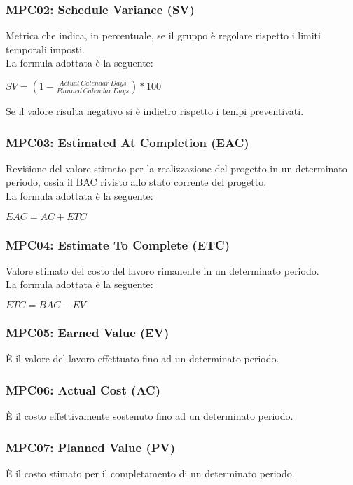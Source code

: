     \subsubsection{MPC02: Schedule Variance (SV)}
    Metrica che indica, in percentuale, se il gruppo è regolare rispetto i limiti temporali imposti.\\
    La formula adottata è la seguente:
    \begin{center}
        $SV = (1-\frac{Actual\ Calendar\ Days}{Planned\ Calendar\ Days})*100$
    \end{center}
    Se il valore risulta negativo si è indietro rispetto i tempi preventivati.

    \subsubsection{MPC03: Estimated At Completion (EAC)}
    Revisione del valore stimato per la realizzazione del progetto in un determinato periodo, ossia il BAC rivisto allo stato corrente del progetto.\\
    La formula adottata è la seguente:
    \begin{center}
        $EAC = AC + ETC$
    \end{center}

    \subsubsection{MPC04: Estimate To Complete (ETC)}
    Valore stimato del costo del lavoro rimanente in un determinato periodo.\\
    La formula adottata è la seguente:
    \begin{center}
        $ETC = BAC - EV$
    \end{center}

    \subsubsection{MPC05: Earned Value (EV)}
    È il valore del lavoro effettuato fino ad un determinato periodo.

    \subsubsection{MPC06: Actual Cost (AC)}
    È il costo effettivamente sostenuto fino ad un determinato periodo.

    \subsubsection{MPC07: Planned Value (PV)}
    È il costo stimato per il completamento di un determinato periodo.

